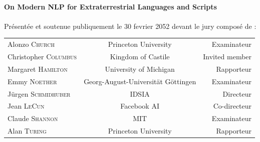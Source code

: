 \begin{titlepage}
\begin{center}
		\hrulefill\\[0.2cm]

		{\Large  \textbf{On Modern NLP for Extraterrestrial Languages and Scripts}}\\[0.1cm]

		\hrulefill\\

		\vspace{0.cm}
		\normalsize Présentée et soutenue publiquement le 30 fevrier 2052 devant le jury composé de :\\
		\vspace{0.4cm}
		\begin{tabular*}{\linewidth}{l c r}
			Alonzo \textsc{Church} & Princeton University & Examinateur \\
			Christopher \textsc{Columbus} & Kingdom of Castile & Invited member\\
			Margaret \textsc{Hamilton} & University of Michigan & Rapporteur \\
			Emmy \textsc{Noether} & Georg-August-Universität Göttingen & Examinateur \\
			Jürgen \textsc{Schmidhuber} & IDSIA & Directeur\\
			Jean \textsc{LeCun} & Facebook AI & Co-directeur\\
			Claude \textsc{Shannon} & MIT & Examinateur \\
			Alan \textsc{Turing} & Princeton University & Rapporteur \\
		\end{tabular*}
	\end{center}

\end{titlepage}


\newpage
\null
\thispagestyle{empty}
\newpage
